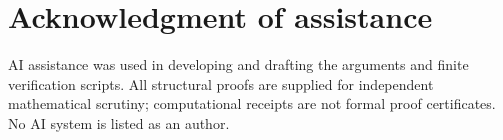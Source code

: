 \section*{Acknowledgment of assistance}
AI assistance was used in developing and drafting the arguments and
finite verification scripts.  All structural proofs are supplied for
independent mathematical scrutiny; computational receipts are not
formal proof certificates.  No AI system is listed as an author.
